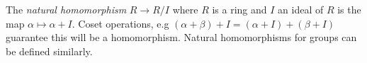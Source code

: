 \documentclass[12pt]{article}
\begin{document}
The \emph{natural homomorphism} $R \rightarrow R/I$ where $R$ is a ring and $I$ an ideal of $R$ is the map $\alpha \mapsto \alpha + I$. Coset operations, e.g $(\alpha + \beta) + I = (\alpha + I) + (\beta + I)$ guarantee this will be a homomorphism. Natural homomorphisms for groups can be defined similarly.
\end{document}
